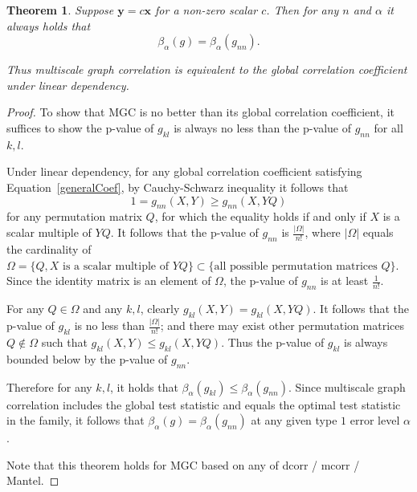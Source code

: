 \documentclass[11pt]{article}
\providecommand{\mb}[1]{\boldsymbol{#1}}
\newtheorem{appThm}{Theorem}
\begin{document}
\begin{appThm}
Suppose $\mb{y}=c\mb{x}$ for a non-zero scalar $c$. Then for any $n$ and $\alpha$ it always holds that
\begin{equation}
\beta_{\alpha}(g) = \beta_{\alpha}(g_{nn}).
\end{equation}

Thus multiscale graph correlation is equivalent to the global correlation coefficient under linear dependency.
\end{appThm}
\begin{proof}
To show that MGC is no better than its global correlation coefficient, it suffices to show the p-value of $g_{kl}$ is always no less than the p-value of $g_{nn}$ for all $k,l$.

Under linear dependency, for any global correlation coefficient satisfying Equation~\ref{generalCoef}, by Cauchy-Schwarz inequality it follows that
\begin{equation}
1=g_{nn}(X, Y) \geq g_{nn}(X, YQ)
\end{equation}
for any permutation matrix $Q$, for which the equality holds if and only if $X$ is a scalar multiple of $YQ$. It follows that the p-value of $g_{nn}$ is $\frac{|\Omega|}{n!}$, where $|\Omega|$ equals the cardinality of $\Omega=\{Q, X \mbox{ is a scalar multiple of }YQ\} \subset \{\mbox{all possible permutation matrices }Q\}$. Since the identity matrix is an element of $\Omega$, the p-value of $g_{nn}$ is at least $\frac{1}{n!}$.

For any $Q \in \Omega$ and any $k,l$, clearly $g_{kl}(X,Y)=g_{kl}(X,YQ)$. It follows that the p-value of $g_{kl}$ is no less than $\frac{|\Omega|}{n!}$; and there may exist other permutation matrices $Q \notin \Omega$ such that $g_{kl}(X,Y) \leq g_{kl}(X,YQ)$. Thus the p-value of $g_{kl}$ is always bounded below by the p-value of $g_{nn}$.

Therefore for any $k,l$, it holds that $\beta_{\alpha}(g_{kl}) \leq \beta_{\alpha}(g_{nn})$. Since multiscale graph correlation includes the global test statistic and equals the optimal test statistic in the family, it follows that $\beta_{\alpha}(g) = \beta_{\alpha}(g_{nn})$ at any given type $1$ error level $\alpha$.

Note that this theorem holds for MGC based on any of dcorr / mcorr / Mantel.
\end{proof}
\end{document}
